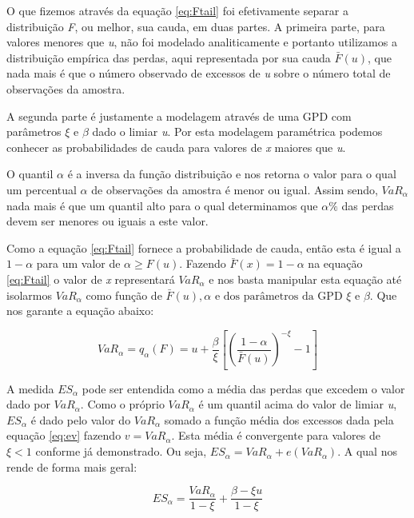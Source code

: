 \documentclass[review]{elsarticle}
\theoremstyle{definition}
\begin{document}
O que fizemos através da equação \eqref{eq:Ftail} foi efetivamente separar a distribuição \emph{F}, ou melhor, sua cauda, em duas partes. A primeira parte, para valores menores que \emph{u}, não foi modelado analiticamente e portanto utilizamos a distribuição empírica das perdas, aqui representada por sua cauda $\bar{F}(u)$, que nada mais é que o número observado de excessos de \emph{u} sobre o número total de observações da amostra.

A segunda parte é justamente a modelagem através de uma GPD com parâmetros $\xi \text{ e } \beta$ dado o limiar \emph{u}. Por esta modelagem paramétrica podemos conhecer as probabilidades de cauda para valores de \emph{x} maiores que \emph{u}.

O quantil $\alpha$ é a inversa da função distribuição e nos retorna o valor para o qual um percentual $\alpha$ de observações da amostra é menor ou igual. Assim sendo, $VaR_\alpha$ nada mais é que um quantil alto para o qual determinamos que $\alpha \%$ das perdas devem ser menores ou iguais a este valor.

Como a equação \eqref{eq:Ftail} fornece a probabilidade de cauda, então esta é igual a $1- \alpha$ para um valor de $\alpha  \geq F(u)$. Fazendo $\bar{F}(x)=1-\alpha$ na equação \eqref{eq:Ftail} o valor de \emph{x} representará $VaR_\alpha$ e nos basta manipular esta equação até isolarmos $VaR_\alpha$ como função de $\bar{F}(u), \alpha \text{ e dos parâmetros da GPD } \xi \text{ e } \beta$. Que nos garante a equação abaixo:

\begin{equation}
\label{eq:VaRGPD}
VaR_\alpha = q_\alpha(F) = u+\frac{\beta}{\xi}\left[ \left( \frac{1-\alpha}{\bar{F}(u)}\right)^{-\xi}-1 \right]
\end{equation}

A medida $ES_\alpha$ pode ser entendida como a média das perdas que excedem o valor dado por $VaR_\alpha$. Como o próprio $VaR_\alpha$ é um quantil acima do valor de limiar \emph{u}, $ES_\alpha$ é dado pelo valor do $VaR_\alpha$ somado a função média dos excessos dada pela equação \eqref{eq:ev} fazendo $v = VaR_\alpha$. Esta média é convergente para valores de $\xi < 1$ conforme já demonstrado. Ou seja, $ES_\alpha=VaR_\alpha + e(VaR_\alpha)$. A qual nos rende de forma mais geral:

\begin{equation}
\label{eq:ESGPD}
ES_\alpha = \frac{VaR_\alpha}{1-\xi}+\frac{\beta-\xi u}{1-\xi}
\end{equation}
\end{document}
